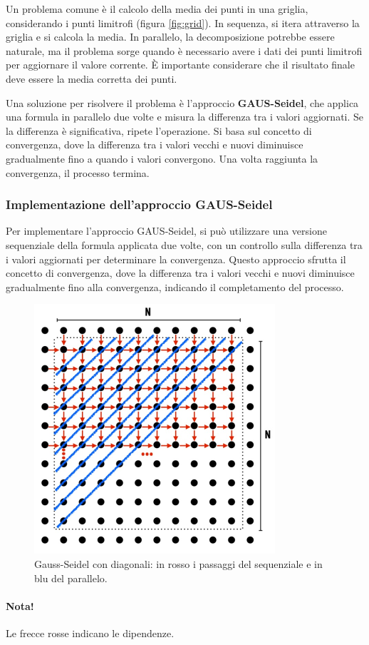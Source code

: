 Un problema comune è il calcolo della media dei punti in una griglia, considerando i punti limitrofi (figura \ref{fig:grid}). In sequenza, si itera attraverso la griglia e si calcola la media. In parallelo, la decomposizione potrebbe essere naturale, ma il problema sorge quando è necessario avere i dati dei punti limitrofi per aggiornare il valore corrente. È importante considerare che il risultato finale deve essere la media corretta dei punti.

Una soluzione per risolvere il problema è l'approccio \textbf{GAUS-Seidel}, che applica una formula in parallelo due volte e misura la differenza tra i valori aggiornati. Se la differenza è significativa, ripete l'operazione. Si basa sul concetto di convergenza, dove la differenza tra i valori vecchi e nuovi diminuisce gradualmente fino a quando i valori convergono. Una volta raggiunta la convergenza, il processo termina.

\subsubsection{Implementazione dell'approccio GAUS-Seidel}

Per implementare l'approccio GAUS-Seidel, si può utilizzare una versione sequenziale della formula applicata due volte, con un controllo sulla differenza tra i valori aggiornati per determinare la convergenza. Questo approccio sfrutta il concetto di convergenza, dove la differenza tra i valori vecchi e nuovi diminuisce gradualmente fino alla convergenza, indicando il completamento del processo.
\begin{figure}[th]
	\centering
	\includegraphics[width=0.45\linewidth]{img/red-black-diagonals}
	\caption{Gauss-Seidel con diagonali: in rosso i passaggi del sequenziale e in blu del parallelo.}
	\label{fig:red-black-diagonals}
\end{figure}

\paragraph{\color{red}Nota!}Le frecce {\color{red}rosse} indicano le dipendenze.
